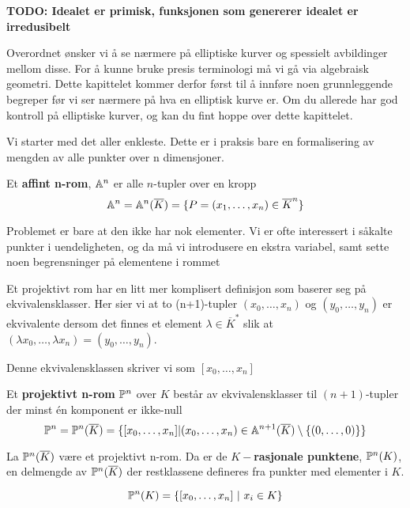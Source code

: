 \textbf{TODO: Idealet er primisk, funksjonen som genererer idealet er irredusibelt}

Overordnet ønsker vi å se nærmere på elliptiske kurver og spessielt avbildinger mellom disse. For å kunne bruke presis terminologi må vi gå via algebraisk geometri. Dette kapittelet kommer derfor først til å innføre noen grunnleggende begreper før vi ser nærmere på hva en elliptisk kurve er. Om du allerede har god kontroll på elliptiske kurver, og kan du fint hoppe over dette kapittelet.



Vi starter med det aller enkleste. Dette er i praksis bare en formalisering av mengden av alle punkter over n dimensjoner.
\begin{definisjon}
Et \textbf{affint n-rom}, $\mathbb{A}^n$ er alle $n$-tupler over en kropp $$\mathbb{A} ^n = \mathbb{A}^n(\overline{K}) = \{P = (x_1, \ldots, x_n ) \in \overline{K}^n \}$$
\end{definisjon}

Problemet er bare at den ikke har nok elementer. Vi er ofte interessert i såkalte punkter i uendeligheten, og da må vi introdusere en ekstra variabel, samt sette noen begrensninger på elementene i rommet

Et projektivt rom har en litt mer komplisert definisjon som baserer seg på ekvivalensklasser. Her sier vi at to (n+1)-tupler $(x_0, \ldots, x_n)$ og $(y_0, \ldots, y_n)$ er ekvivalente dersom det finnes et element $\lambda \in \overline{K}^*$ slik at $(\lambda x_0, \ldots, \lambda x_n) = (y_0, \ldots, y_n)$.

Denne ekvivalensklassen skriver vi som $[x_0, \ldots, x_n]$
\begin{definisjon}
    Et \textbf{projektivt n-rom} $\mathbb{P}^n$ over $K$ består av ekvivalensklasser til $(n+1)$-tupler der minst én komponent er ikke-null $$\mathbb{P}^n = \mathbb{P}^n(\overline{K}) = \{[x_0, \ldots, x_n] | (x_0, \ldots, x_n) \in \mathbb{A} ^{n+1}(\overline{K}) \setminus \{(0, \ldots, 0)\} \}$$
\end{definisjon}

\begin{definisjon}
La $\mathbb{P}^n(\overline{K})$ være et projektivt n-rom. Da er de \textbf{$K-$rasjonale punktene}, $\mathbb{P}^n(K)$, en delmengde av $\mathbb{P}^n(\overline{K})$ der restklassene defineres fra punkter med elementer i $K$. 

$$\mathbb{P}^n(K) = \{[x_0, \ldots, x_n] \text{ $|$ } x_i \in K \} $$
\end{definisjon}

